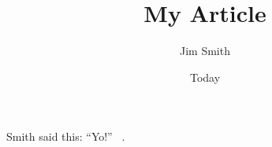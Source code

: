\documentclass[11pt]{article}
\begin{document}
\title{My Article}
\author{Jim Smith}
\date{Today}
\maketitle

Smith said this: ``Yo!'' ~\cite{Smith12}.

{}

\end{document}
